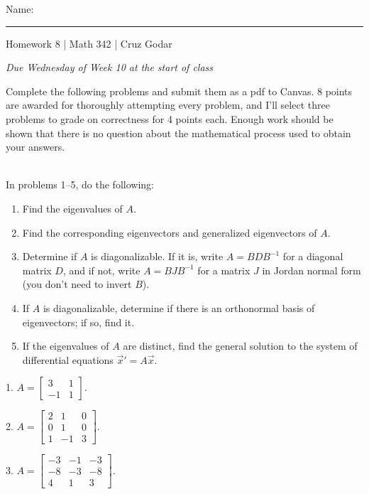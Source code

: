 \documentclass{article}
\begin{document}
\Large Name: \rule{2in}{0.15mm} \hfill Homework 8 | Math 342 | Cruz Godar \vspace{4pt} \normalsize

\textit{Due Wednesday of Week 10 at the start of class}

Complete the following problems and submit them as a pdf to Canvas. 8 points are awarded for thoroughly attempting every problem, and I'll select three problems to grade on correctness for 4 points each. Enough work should be shown that there is no question about the mathematical process used to obtain your answers.

~\\

In problems 1--5, do the following:

\begin{enumerate}

	\item Find the eigenvalues of $A$.

	\item Find the corresponding eigenvectors and generalized eigenvectors of $A$.

	\item Determine if $A$ is diagonalizable. If it is, write $A = BDB^{-1}$ for a diagonal matrix $D$, and if not, write $A = BJB^{-1}$ for a matrix $J$ in Jordan normal form (you don't need to invert $B$).

	\item If $A$ is diagonalizable, determine if there is an orthonormal basis of eigenvectors; if so, find it.

	\item If the eigenvalues of $A$ are distinct, find the general solution to the system of differential equations $\vec{x}' = A\vec{x}$.

\end{enumerate}

1. $A = \left[\begin{array}{cc} 3& 1 \\ -1& 1 \end{array}\right]$.

2. $A = \left[\begin{array}{ccc} 2& 1& 0 \\ 0& 1& 0 \\ 1& -1& 3 \end{array}\right]$.

3. $A = \left[\begin{array}{ccc} -3& -1& -3 \\ -8& -3& -8 \\ 4& 1& 3 \end{array}\right]$.
\end{document}
